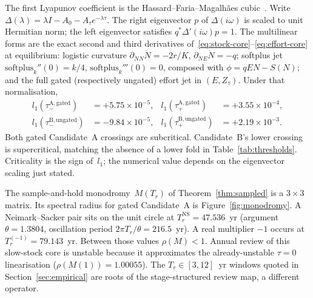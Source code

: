 \documentclass[11pt]{article}
\theoremstyle{definition}
\begin{document}
The first Lyapunov coefficient is the Hassard--Faria--Magalhães cubic~\cite{hassard1981,faria1995}. Write $\Delta(\lambda)=\lambda I-A_0-A_\tau e^{-\lambda\tau}$. The right eigenvector $p$ of $\Delta(i\omega)$ is scaled to unit Hermitian norm; the left eigenvector satisfies $q^*\Delta'(i\omega)p=1$. The multilinear forms are the exact second and third derivatives of~\eqref{eq:stock-core}--\eqref{eq:effort-core} at equilibrium: logistic curvature $\partial_{NN}\dot N=-2r/K$, $\partial_{NE}\dot N=-q$; softplus jet $\mathrm{softplus}_k''(0)=k/4$, $\mathrm{softplus}_k'''(0)=0$, composed with $\phi=qEN-S(N)$; and the full gated (respectively ungated) effort jet in $(E,Z_\tau)$. Under that normalisation,
\begin{equation}
\begin{aligned}
l_1(\tau_-^{\mathrm{A,gated}})&=+5.75\times 10^{-5},&
l_1(\tau_+^{\mathrm{A,gated}})&=+3.55\times 10^{-4},\\
l_1(\tau_-^{\mathrm{B,ungated}})&=-9.84\times 10^{-5},&
l_1(\tau_+^{\mathrm{B,ungated}})&=+2.19\times 10^{-3}.
\end{aligned}
\label{eq:l1-values}
\end{equation}
Both gated Candidate~A crossings are subcritical. Candidate~B's lower crossing is supercritical, matching the absence of a lower fold in Table~\ref{tab:thresholds}. Criticality is the sign of~$l_1$; the numerical value depends on the eigenvector scaling just stated.

The sample-and-hold monodromy~$M(T_r)$ of Theorem~\ref{thm:sampled} is a $3\times 3$ matrix. Its spectral radius for gated Candidate~A is Figure~\ref{fig:monodromy}. A Neimark--Sacker pair sits on the unit circle at $T_r^{\mathrm{NS}}=47.536$~yr (argument $\theta=1.3804$, oscillation period $2\pi T_r/\theta=216.5$~yr). A real multiplier $-1$ occurs at $T_r^{(-1)}=79.143$~yr. Between those values $\rho(M)<1$. Annual review of this slow-stock core is unstable because it approximates the already-unstable $\tau=0$ linearisation ($\rho(M(1))=1.00055$). The $T_r\in[3,12]$~yr windows quoted in Section~\ref{sec:empirical} are roots of the stage-structured review map, a different operator.
\end{document}
